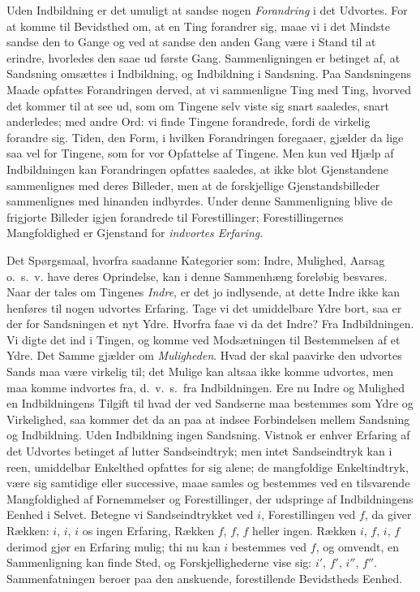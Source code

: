 \documentclass[12pt]{book}
\newcommand{\apage}[1]{\marginnote{\footnotesize\textit{[#1]}}}
\begin{document}
Uden Indbildning er det umuligt at sandse nogen \emph{Forandring} i det Udvortes.
For at komme til Bevidsthed om, at en Ting forandrer sig, maae vi i det
Mindste sandse den to Gange og ved at sandse den anden Gang være i Stand
til at erindre, hvorledes den saae ud første Gang. Sammenligningen er
betinget af, at Sandsning omsættes i Indbildning, og Indbildning i
Sandsning. Paa Sandsningens Maade opfattes Forandringen derved, at vi
sammenligne Ting med Ting, hvorved det kommer til at see ud, som om
Tingene selv viste sig snart saaledes, snart anderledes; med andre Ord: vi
finde Tingene forandrede, fordi de virkelig forandre sig. Tiden, den Form,
i hvilken Forandringen foregaaer, gjælder da lige saa vel for Tingene, som
for vor Opfattelse af Tingene. Men kun ved Hjælp af Indbildningen kan
Forandringen opfattes saaledes, at ikke blot Gjenstandene sammenlignes med
deres \apage{22} Billeder, men at de forskjellige Gjenstandsbilleder sammenlignes med
hinanden indbyrdes. Under denne Sammenligning blive de frigjorte Billeder
igjen forandrede til Forestillinger; Forestillingernes Mangfoldighed er
Gjenstand for \emph{indvortes Erfaring}.

Det Spørgsmaal, hvorfra saadanne Kategorier som: Indre, Mulighed, Aarsag
o.\ s.\ v. have deres Oprindelse, kan i denne Sammenhæng foreløbig besvares.
Naar der tales om Tingenes \emph{Indre}, er det jo indlysende, at dette Indre
ikke kan henføres til nogen udvortes Erfaring. Tage vi det umiddelbare
Ydre bort, saa er der for Sandsningen et nyt Ydre. Hvorfra faae vi
da det Indre? Fra Indbildningen. Vi digte det ind i Tingen, og komme ved
Modsætningen til Bestemmelsen af et Ydre. Det Samme gjælder om
\emph{Muligheden}. Hvad der skal paavirke den udvortes Sands maa være virkelig
til; det Mulige kan altsaa ikke komme udvortes, men maa komme indvortes
fra, d.\ v.\ s.\ fra Indbildningen. Ere nu Indre og Mulighed en Indbildningens
Tilgift til hvad der ved Sandserne maa bestemmes som Ydre og Virkelighed,
saa kommer det da an paa at indsee Forbindelsen mellem Sandsning og
Indbildning. Uden Indbildning ingen Sandsning. Vistnok er enhver Erfaring
af det Udvortes betinget af lutter Sandseindtryk; men intet Sandseindtryk
kan i reen, umiddelbar Enkelthed opfattes for sig alene; de mangfoldige
Enkeltindtryk, være sig samtidige eller successive, maae samles og
bestemmes ved en tilsvarende Mangfoldighed af Fornemmelser og
Forestillinger, der udspringe af Indbildningens Eenhed i Selvet. Betegne
vi Sandseindtrykket ved $i$, \apage{23} Forestillingen ved $f$, da giver Rækken: $i$,
$i$, $i$ os ingen Erfaring, Rækken $f$, $f$, $f$ heller ingen. Rækken $i$,
$f$, $i$, $f$ derimod gjør en Erfaring mulig; thi nu kan $i$ bestemmes ved
$f$, og omvendt, en Sammenligning kan finde Sted, og Forskjellighederne
vise sig: $i'$, $f'$, $i''$, $f''$. Sammenfatningen beroer paa den
anskuende, forestillende Bevidstheds Eenhed.
\end{document}
